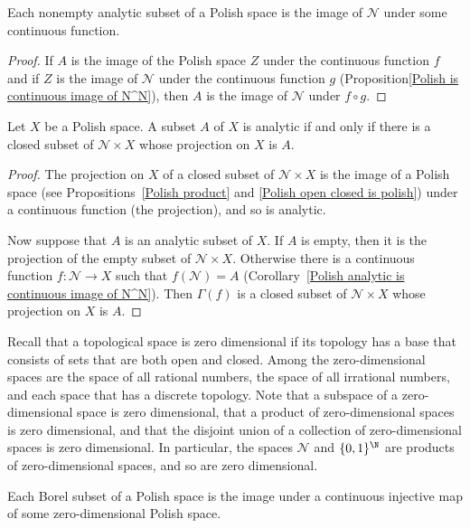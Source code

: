 \begin{corollary}\label{Polish analytic is continuous image of N^N}
Each nonempty analytic subset of a Polish space is the image of $\mathscr{N}$ under some continuous function.
\end{corollary}
\begin{proof}
If $A$ is the image of the Polish space $Z$ under the continuous function $f$ and if $Z$ is the image of $\mathscr{N}$ under the continuous function $g$ (Proposition\ref{Polish is continuous image of N^N}), then $A$ is the image of $\mathscr{N}$ under $f\circ g$.
\end{proof}
\begin{proposition}\label{Polish analytic iff closed subset of N times X}
Let $X$ be a Polish space. A subset $A$ of $X$ is analytic if and only if there is a closed subset of $\mathscr{N}\times X$ whose projection on $X$ is $A$.
\end{proposition}
\begin{proof}
The projection on $X$ of a closed subset of $\mathscr{N}\times X$ is the image of a Polish space (see Propositions~\ref{Polish product} and \ref{Polish open closed is polish}) under a continuous function (the projection), and so is analytic.\par
Now suppose that $A$ is an analytic subset of $X$. If $A$ is empty, then it is the projection of the empty subset of $\mathscr{N}\times X$. Otherwise there is a continuous function $f:\mathscr{N}\to X$ such that $f(\mathscr{N})=A$ (Corollary~\ref{Polish analytic is continuous image of N^N}). Then $\Gamma(f)$ is a closed subset of $\mathscr{N}\times X$ whose projection on $X$ is $A$.
\end{proof}
Recall that a topological space is zero dimensional if its topology has a base that consists of sets that are both open and closed. Among the zero-dimensional spaces are the space of all rational numbers, the space of all irrational numbers, and each space that has a discrete topology. Note that a subspace of a zero-dimensional space is zero dimensional, that a product of zero-dimensional spaces is zero dimensional, and that the disjoint union of a collection of zero-dimensional spaces is zero dimensional. In particular, the spaces $\mathscr{N}$ and $\{0,1\}^\N$ are products of zero-dimensional spaces, and so are zero dimensional.
\begin{proposition}\label{Polish Borel is injective image of dim=0 Polish}
Each Borel subset of a Polish space is the image under a continuous injective map of some zero-dimensional Polish space.
\end{proposition}
